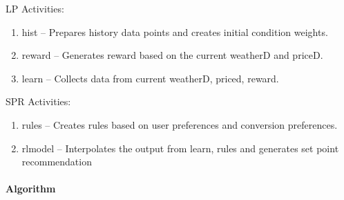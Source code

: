 LP Activities:

\begin{enumerate}
\item hist -- Prepares history data points and creates initial condition weights.
\item reward -- Generates reward based on the current weatherD and priceD.
\item learn -- Collects data from current weatherD, priced, reward.
\end{enumerate}

SPR Activities:

\begin{enumerate}
\item rules -- Creates rules based on user preferences and conversion preferences.
\item rlmodel --  Interpolates the output from learn, rules and generates set point recommendation
\end{enumerate}

\paragraph*{Algorithm}



